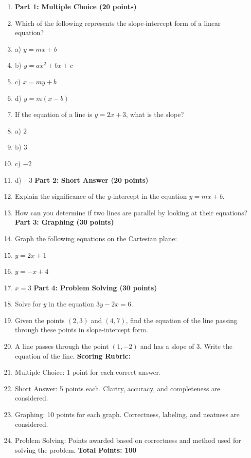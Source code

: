\begin{enumerate}
    \item \textbf{Part 1: Multiple Choice (20 points)}
    \item Which of the following represents the slope-intercept form of a linear equation?
    \item a) $y = mx + b$
    \item b) $y = ax^2 + bx + c$
    \item c) $x = my + b$
    \item d) $y = m(x - b)$
    \item If the equation of a line is $y = 2x + 3$, what is the slope?
    \item a) $2$
    \item b) $3$
    \item c) $-2$
    \item d) $-3$ \textbf{Part 2: Short Answer (20 points)}
    \item Explain the significance of the $y$-intercept in the equation $y = mx + b$.
    \item How can you determine if two lines are parallel by looking at their equations? \textbf{Part 3: Graphing (30 points)}
    \item Graph the following equations on the Cartesian plane:
    \item $y = 2x + 1$
    \item $y = -x + 4$
    \item $x = 3$ \textbf{Part 4: Problem Solving (30 points)}
    \item Solve for $y$ in the equation $3y - 2x = 6$.
    \item Given the points $(2, 3)$ and $(4, 7)$, find the equation of the line passing through these points in slope-intercept form.
    \item A line passes through the point $(1, -2)$ and has a slope of $3$. Write the equation of the line. \textbf{Scoring Rubric:}
    \item Multiple Choice: 1 point for each correct answer.
    \item Short Answer: 5 points each. Clarity, accuracy, and completeness are considered.
    \item Graphing: 10 points for each graph. Correctness, labeling, and neatness are considered.
    \item Problem Solving: Points awarded based on correctness and method used for solving the problem. \textbf{Total Points: 100}
\end{enumerate}

